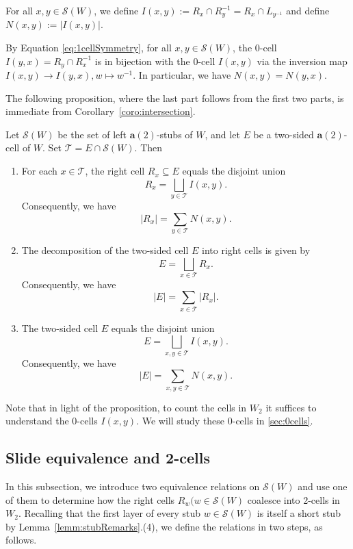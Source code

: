 \documentclass[ALCO,Unicode,published]{cedram}
\newcommand{\calt}{\mathcal{T}}
\newcommand{\la}{\mathbf{a}}
\newcommand{\sw}{\mathcal{S}(W)}
\newcommand{\ra}{\rightarrow}
\newcommand{\se}{\subseteq}
\newcommand{\inverse}{^{-1}}
\newcommand{\abs}[1]{\lvert #1 \rvert}
\begin{document}
\begin{definition}  
For all $x,y\in \sw$, we define $I(x,y):=R_{x}\cap R_y\inverse=R_x\cap L_{y\inverse}$ and define
$N(x,y):=\abs{I(x,y)}$.
\label{def:intersection}
\end{definition} 

\begin{remark}
    By Equation \eqref{eq:1cellSymmetry}, for all $x,y\in \sw$, the 0-cell $I(y,x)=R_y\cap R_x\inverse$ is in
    bijection with the 0-cell $I(x,y)$ via the inversion map $I(x,y)\ra I(y,x), w\mapsto w\inverse$.
    In particular, we have $N(x,y)=N(y,x)$.
    \label{rmk:Isymmetry}
\end{remark}


The following proposition, where the last part follows from the first two parts, is immediate from
Corollary~\ref{coro:intersection}.

\begin{prop}
    \label{prop:a2intersections}
    Let $\sw$ be the set of left $\la(2)$-stubs of $W$, and let $E$ be a two-sided $\la(2)$-cell of $W$. Set
    $\mathcal{T}=E\cap\sw$. Then
    \begin{enumerate}
        \item For each $x\in \calt$, the right cell $R_x\se E $ equals the disjoint union \[
             R_{x}=\bigsqcup_{y\in \calt} I(x,y).\] Consequently, we have \[
             \abs{R_x}=\sum_{y\in\calt} N(x,y).  \]
        \item  The decomposition of the two-sided cell $E$ into right cells is given by
             \[E=\bigsqcup_{x\in \calt}R_x.\] Consequently, we have \[ \abs{E}=\sum_{x\in
             \calt}\abs{R_x}.\] 
         \item The two-sided cell $E$ equals the disjoint union \[ E=\bigsqcup_{x,y\in \mathcal{T}}
              I(x,y).  \] Consequently, we have \[ \abs{E}=\sum_{x,y\in\mathcal{T}}N(x,y).  \]
    \end{enumerate}
\end{prop} 
\noindent
Note that in light of the proposition, to count the cells in $W_2$ it suffices to understand the
0-cells $I(x,y)$. We will study these 0-cells in \autoref{sec:0cells}. 

\subsection{Slide equivalence and 2-cells}
\label{sec:2cells} 
In this subsection, we introduce two equivalence relations on $\sw$ and use one of them to determine
how the right cells $R_w (w\in \sw$ coalesce into 2-cells in $W_2$.  Recalling that the first layer
of every stub $w\in \sw$ is itself a short stub by Lemma~\ref{lemm:stubRemarks}.(4), we define the
relations in two steps, as follows.
\end{document}
